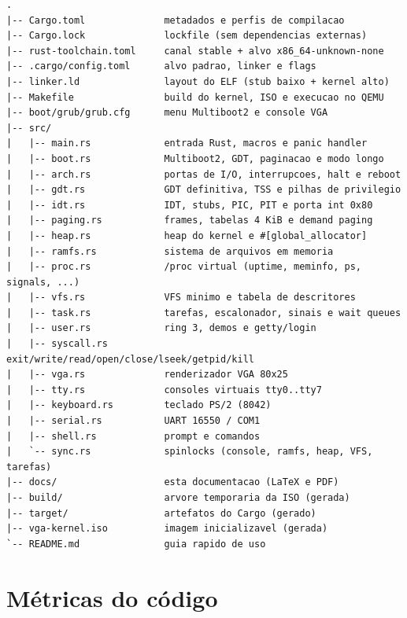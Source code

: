 \begin{lstlisting}[style=shell]
.
|-- Cargo.toml              metadados e perfis de compilacao
|-- Cargo.lock              lockfile (sem dependencias externas)
|-- rust-toolchain.toml     canal stable + alvo x86_64-unknown-none
|-- .cargo/config.toml      alvo padrao, linker e flags
|-- linker.ld               layout do ELF (stub baixo + kernel alto)
|-- Makefile                build do kernel, ISO e execucao no QEMU
|-- boot/grub/grub.cfg      menu Multiboot2 e console VGA
|-- src/
|   |-- main.rs             entrada Rust, macros e panic handler
|   |-- boot.rs             Multiboot2, GDT, paginacao e modo longo
|   |-- arch.rs             portas de I/O, interrupcoes, halt e reboot
|   |-- gdt.rs              GDT definitiva, TSS e pilhas de privilegio
|   |-- idt.rs              IDT, stubs, PIC, PIT e porta int 0x80
|   |-- paging.rs           frames, tabelas 4 KiB e demand paging
|   |-- heap.rs             heap do kernel e #[global_allocator]
|   |-- ramfs.rs            sistema de arquivos em memoria
|   |-- proc.rs             /proc virtual (uptime, meminfo, ps, signals, ...)
|   |-- vfs.rs              VFS minimo e tabela de descritores
|   |-- task.rs             tarefas, escalonador, sinais e wait queues
|   |-- user.rs             ring 3, demos e getty/login
|   |-- syscall.rs          exit/write/read/open/close/lseek/getpid/kill
|   |-- vga.rs              renderizador VGA 80x25
|   |-- tty.rs              consoles virtuais tty0..tty7
|   |-- keyboard.rs         teclado PS/2 (8042)
|   |-- serial.rs           UART 16550 / COM1
|   |-- shell.rs            prompt e comandos
|   `-- sync.rs             spinlocks (console, ramfs, heap, VFS, tarefas)
|-- docs/                   esta documentacao (LaTeX e PDF)
|-- build/                  arvore temporaria da ISO (gerada)
|-- target/                 artefatos do Cargo (gerado)
|-- vga-kernel.iso          imagem inicializavel (gerada)
`-- README.md               guia rapido de uso
\end{lstlisting}

\section{M\'etricas do c\'odigo}

